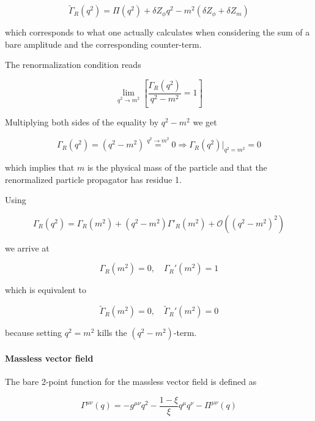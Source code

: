 \documentclass[../FeynCalcManual.tex]{subfiles}
\begin{document}
\begin{equation}
\tilde{\Gamma}_R(q^2) = \Pi(q^2) + \delta Z_{\phi} q^2 - m^2 (\delta Z_{\phi} + \delta Z_{m}   )
\end{equation}

which corresponds to what one actually calculates when considering the
sum of a bare amplitude and the corresponding counter-term.

The renormalization condition reads

\begin{equation}
\lim_{q^2 \to m^2} \left [ \frac{\Gamma_R (q^2)}{q^2 - m^2}  = 1 \right ]
\end{equation}

Multiplying both sides of the equality by \(q^2-m^2\) we get

\begin{equation}
\Gamma_R (q^2)  = ( q^2-m^2) \overset{q^2 \to m^2}{=} 0 \Rightarrow \Gamma_R (q^2) \biggl |_{q^2=m^2}  = 0
\end{equation}

which implies that \(m\) is the physical mass of the particle and that
the renormalized particle propagator has residue 1.

Using

\begin{equation}
\Gamma_R (q^2) =  \Gamma_R (m^2) + (q^2 - m^2) \Gamma'_R (m^2) + \mathcal{O}( (q^2 - m^2)^2)
\end{equation}

we arrive at

\begin{equation}
\Gamma_R(m^2) = 0, \quad \Gamma_R'(m^2) = 1
\end{equation}

which is equivalent to

\begin{equation}
\tilde{\Gamma}_R(m^2) = 0, \quad \tilde{\Gamma}_R'(m^2) = 0
\end{equation}

because setting \(q^2 = m^2\) kills the \((q^2-m^2)\)-term.

\hypertarget{massless-vector-field}{%
\paragraph{Massless vector field}\label{massless-vector-field}}

The bare 2-point function for the massless vector field is defined as

\begin{equation}
    \Gamma^{\mu \nu} (q) = -g^{\mu \nu} q^2 - \frac{1-\xi}{\xi} q^{\mu} q^{\nu}  - \Pi^{\mu \nu} (q)
\end{equation}
\end{document}
